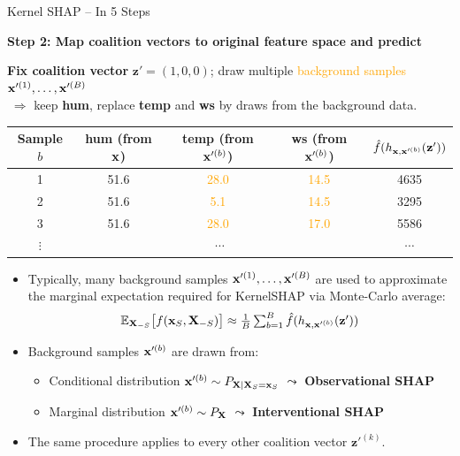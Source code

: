 \documentclass[10pt,compress,t,notes=noshow, xcolor=table]{beamer}
\begin{document}
\begin{frame}{Kernel SHAP – In 5 Steps}

\textbf{Step 2: Map coalition vectors to original feature space and predict}

\medskip

\textbf{Fix coalition vector} \(\mathbf{z}'=(1,0,0)\); draw multiple \textcolor{orange}{background samples $\mathbf{x}'^{(1)}, \dots, \mathbf{x}'^{(B)}$}\\
\(\;\Rightarrow\) keep \textbf{hum}, replace \textbf{temp} and \textbf{ws} by draws from the background data.

\begin{table}\centering\small
\begin{tabular}{c|ccc|c}
Sample \(b\) & hum (from \(\mathbf{x}\)) & temp (from $\mathbf{x}'^{(b)}$) & ws (from $\mathbf{x}'^{(b)}$)  & \(\hat{f}(h_{\mathbf{x}, \mathbf{x}'^{(b)}}(\mathbf{z}'))\) \\
\hline
1 & 51.6 & \textcolor{orange}{28.0} & \textcolor{orange}{14.5} & 4635 \\
2 & 51.6 & \textcolor{orange}{5.1} & \textcolor{orange}{14.5} & 3295 \\
3 & 51.6 & \textcolor{orange}{28.0} & \textcolor{orange}{17.0} & 5586 \\
$\vdots$ & \multicolumn{3}{c}{$\cdots$} & $\cdots$ \\
\end{tabular}
\end{table}


\begin{itemize}
  \item Typically, many background samples $\mathbf{x}'^{(1)}, \dots, \mathbf{x}'^{(B)}$ are used to approximate the marginal expectation required for KernelSHAP via Monte-Carlo average:
  $$ \textstyle \mathbb{E}_{\mathbf{X}_{-S}}\bigl[f(\mathbf{x}_S,\mathbf{X}_{-S})\bigr] \approx
\frac{1}{B}\sum_{b=1}^{B}\hat{f}(h_{\mathbf{x}, \mathbf{x}'^{(b)}}(\mathbf{z}'))$$
\item Background samples \( \mathbf{x}'^{(b)} \) are drawn from:
\begin{itemize}
  \item Conditional distribution \( \mathbf{x}'^{(b)} \sim P_{\mathbf{X} \mid \mathbf{X}_S = \mathbf{x}_S} \) $\leadsto$ \textbf{Observational SHAP} 
  \item Marginal distribution \( \mathbf{x}'^{(b)} \sim P_{\mathbf{X}} \) $\leadsto$  \textbf{Interventional SHAP}
\end{itemize}

\item The same procedure applies to every other coalition vector \(\mathbf{z}'^{(k)}\).
\end{itemize}

\end{frame}
\end{document}
